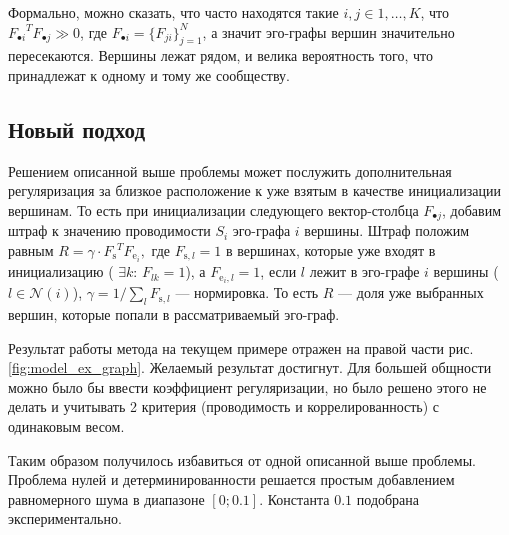 \documentclass{ITaSconf}
\begin{document}
Формально, можно сказать, что часто находятся такие $i,j \in {1,\dots, K}$, что ${F_{\bullet i}}^T F_{\bullet j} \gg 0$, где $F_{\bullet i} = \{F_{j i}\}_{j=1}^N$, а значит эго-графы вершин значительно пересекаются. 
Вершины лежат рядом, и велика вероятность того, что принадлежат к одному и тому же сообществу.

\subsection{Новый подход}

Решением описанной выше проблемы может послужить дополнительная регуляризация за близкое расположение к уже взятым в качестве инициализации вершинам. 
То есть при инициализации следующего вектор-столбца $F_{\bullet j}$, добавим штраф к значению проводимости $S_i$ эго-графа $i$ вершины. Штраф положим равным 
$R = \gamma \cdot {F_{\mathrm{s}}}^T  F_{\mathrm{e}_i},$
где $F_{\mathrm{s}, l} = 1$ в вершинах, которые уже входят в инициализацию ( $\exists k:\, F_{lk}=1 $),
а $F_{\mathrm{e}_i, l} = 1$, если $l$ лежит в эго-графе $i$ вершины ($l \in \mathcal{N}(i)$),
$\gamma = 1 / \sum_l F_{\mathrm{s}, l}$ --- нормировка. 
То есть $R$ --- доля уже выбранных вершин, которые попали в рассматриваемый эго-граф.  

Результат работы метода на текущем примере отражен на правой части рис. \ref{fig:model_ex_graph}. Желаемый результат достигнут. Для большей общности можно было бы ввести коэффициент регуляризации, но было решено этого не делать и учитывать 2 критерия (проводимость и коррелированность) с одинаковым весом. 

Таким образом получилось избавиться от одной описанной выше проблемы. 
Проблема нулей и детерминированности решается простым добавлением равномерного шума в диапазоне $[0; 0.1]$. Константа $0.1$ подобрана экспериментально. 
\end{document}

